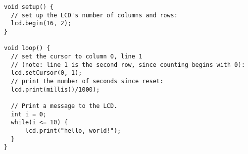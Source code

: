\begin{lstlisting}
void setup() {
  // set up the LCD's number of columns and rows: 
  lcd.begin(16, 2);
}

void loop() {
  // set the cursor to column 0, line 1
  // (note: line 1 is the second row, since counting begins with 0):
  lcd.setCursor(0, 1);
  // print the number of seconds since reset:
  lcd.print(millis()/1000);
  
  // Print a message to the LCD.
  int i = 0;
  while(i <= 10) {
      lcd.print("hello, world!");
  }
}
\end{lstlisting}